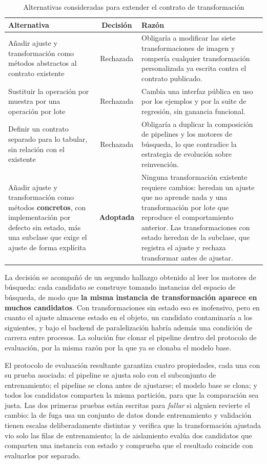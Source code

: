 \documentclass[12pt,letterpaper,oneside]{article}
\begin{document}
\begin{table}[H]
\centering
\small
\caption{Alternativas consideradas para extender el contrato de transformación}
\label{tab:alternativas-contrato}
\begin{tabularx}{\textwidth}{>{}L>{}C>{}L}
\toprule
\textbf{Alternativa} & \textbf{Decisión} & \textbf{Razón} \\
\midrule
Añadir ajuste y transformación como métodos abstractos al contrato existente &
Rechazada &
Obligaría a modificar las siete transformaciones de imagen y rompería cualquier
transformación personalizada ya escrita contra el contrato publicado. \\
\addlinespace
Sustituir la operación por muestra por una operación por lote &
Rechazada &
Cambia una interfaz pública en uso por los ejemplos y por la suite de regresión, sin
ganancia funcional. \\
\addlinespace
Definir un contrato separado para lo tabular, sin relación con el existente &
Rechazada &
Obligaría a duplicar la composición de pipelines y los motores de búsqueda, lo que
contradice la estrategia de evolución sobre reinvención. \\
\addlinespace
Añadir ajuste y transformación como métodos \textbf{concretos}, con implementación por
defecto sin estado, más una subclase que exige el ajuste de forma explícita &
\textbf{Adoptada} &
Ninguna transformación existente requiere cambios: heredan un ajuste que no aprende nada y
una transformación por lote que reproduce el comportamiento anterior. Las
transformaciones con estado heredan de la subclase, que registra el ajuste y rechaza
transformar antes de ajustar. \\
\bottomrule
\end{tabularx}
\end{table}

La decisión se acompañó de un segundo hallazgo obtenido al leer los motores de búsqueda:
cada candidato se construye tomando instancias del espacio de búsqueda, de modo que
\textbf{la misma instancia de transformación aparece en muchos candidatos}. Con
transformaciones sin estado eso es inofensivo, pero en cuanto el ajuste almacene estado en
el objeto, un candidato contaminaría a los siguientes, y bajo el backend de paralelización
habría además una condición de carrera entre procesos. La solución fue clonar el pipeline
dentro del protocolo de evaluación, por la misma razón por la que ya se clonaba el modelo
base.

El protocolo de evaluación resultante garantiza cuatro propiedades, cada una con su prueba
asociada: el pipeline se ajusta solo con el subconjunto de entrenamiento; el pipeline se
clona antes de ajustarse; el modelo base se clona; y todos los candidatos comparten la
misma partición, para que la comparación sea justa. Las dos primeras pruebas están escritas
para \emph{fallar} si alguien revierte el cambio: la de fuga usa un conjunto de datos donde
entrenamiento y validación tienen escalas deliberadamente distintas y verifica que la
transformación ajustada vio solo las filas de entrenamiento; la de aislamiento evalúa dos
candidatos que comparten una instancia con estado y comprueba que el resultado coincide con
evaluarlos por separado.
\end{document}
